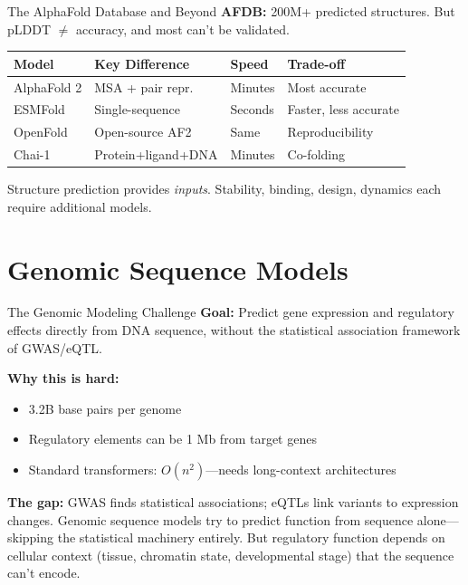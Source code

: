 \documentclass[aspectratio=169,10pt]{beamer}
\begin{document}
\begin{frame}{The AlphaFold Database and Beyond}
\textbf{AFDB:} 200M+ predicted structures. But pLDDT $\neq$ accuracy, and most can't be validated.
\vspace{0.2em}
\begin{center}
\renewcommand{\arraystretch}{1.15}
{\small
\begin{tabular}{p{2.2cm}p{3cm}p{2.5cm}p{3cm}}
\toprule
\textbf{Model} & \textbf{Key Difference} & \textbf{Speed} & \textbf{Trade-off} \\
\midrule
AlphaFold 2 & MSA + pair repr. & Minutes & Most accurate \\
ESMFold & Single-sequence & Seconds & Faster, less accurate \\
OpenFold & Open-source AF2 & Same & Reproducibility \\
Chai-1 & Protein+ligand+DNA & Minutes & Co-folding \\
\bottomrule
\end{tabular}}
\end{center}
\vspace{0.1em}
{\small Structure prediction provides \emph{inputs}. Stability, binding, design, dynamics each require additional models.}
\end{frame}

\section{Genomic Sequence Models}

\begin{frame}{The Genomic Modeling Challenge}
\textbf{Goal:} Predict gene expression and regulatory effects directly from DNA sequence, without the statistical association framework of GWAS/eQTL.

\vspace{0.2em}
\textbf{Why this is hard:}
\begin{itemize}
    \item 3.2B base pairs per genome
    \item Regulatory elements can be 1 Mb from target genes
    \item Standard transformers: $O(n^2)$---needs long-context architectures
\end{itemize}
\vspace{0.2em}
\textbf{The gap:} GWAS finds statistical associations; eQTLs link variants to expression changes. Genomic sequence models try to predict function from sequence alone---skipping the statistical machinery entirely. But regulatory function depends on cellular context (tissue, chromatin state, developmental stage) that the sequence can't encode.
\end{frame}
\end{document}
